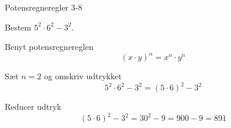 \documentclass{article}
\begin{document}
\newpage

\begin{exercise}{Potensregneregler 3-8}
	
	Bestem $5^2 \cdot 6^2 - 3^2$.
	
	
	\hint
	
	Benyt potensregnereglen
	\[
	(x \cdot y)^n = x^n \cdot y^n
	\]
	
	\hint
	
	Sæt $n=2$ og omskriv udtrykket
	\[
	5^2 \cdot 6^2 - 3^2 = (5 \cdot 6)^2 - 3^2
	\]
	
	\hint
	
	Reducer udtryk
	\[
	(5 \cdot 6)^2 - 3^2 = 30^2 - 9 = 900-9 = 891
	\]
	
	
\end{exercise}
 
\end{document}

